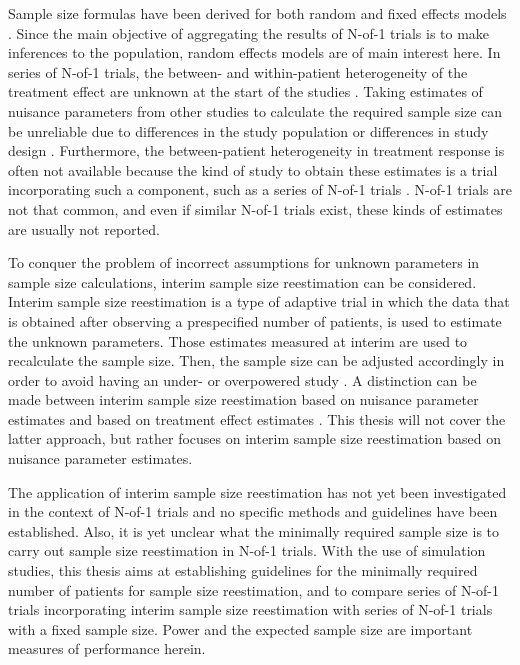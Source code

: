 \documentclass[11pt]{article}
\begin{document}
Sample size formulas have been derived for both random and fixed effects models \cite{senn2019}. Since the main objective of aggregating the results of N-of-1 trials is to make inferences to the population, random effects models are of main interest here. In series of N-of-1 trials, the between- and within-patient heterogeneity of the treatment effect are unknown at the start of the studies \cite{senn2019}. Taking estimates of nuisance parameters from other studies to calculate the required sample size can be unreliable due to differences in the study population or differences in study design \cite{zucker2002}. Furthermore, the between-patient heterogeneity in treatment response is often not available because the kind of study to obtain these estimates is a trial incorporating such a component, such as a series of N-of-1 trials \cite{senn2016}. N-of-1 trials are not that common, and even if similar N-of-1 trials exist, these kinds of estimates are usually not reported. 

To conquer the problem of incorrect assumptions for unknown parameters in sample size calculations, interim sample size reestimation can be considered. Interim sample size reestimation is a type of adaptive trial in which the data that is obtained after observing a prespecified number of patients, is used to estimate the unknown parameters. Those estimates measured at interim are used to recalculate the sample size. Then, the sample size can be adjusted accordingly in order to avoid having an under- or overpowered study \cite{proschan2005}. A distinction can be made between interim sample size reestimation based on nuisance parameter estimates and based on treatment effect estimates \cite{proschan2009}. This thesis will not cover the latter approach, but rather focuses on interim sample size reestimation based on nuisance parameter estimates. 

The application of interim sample size reestimation has not yet been investigated in the context of N-of-1 trials and no specific methods and guidelines have been established. Also, it is yet unclear what the minimally required sample size is to carry out sample size reestimation in N-of-1 trials. With the use of simulation studies, this thesis aims at establishing guidelines for the minimally required number of patients for sample size reestimation, and to compare series of N-of-1 trials incorporating interim sample size reestimation with series of N-of-1 trials with a fixed sample size. Power and the expected sample size are important measures of performance herein. 
\end{document}
